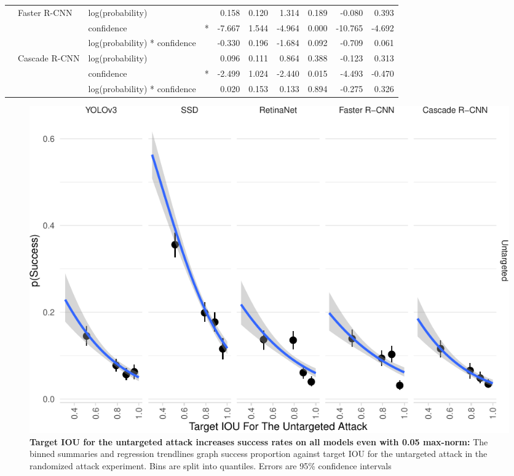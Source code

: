 \begin{longtable}[t]{llllrrrrrr}
\cmidrule{2-10}\nopagebreak
\hspace{1em} & Faster R-CNN & log(probability) &  & 0.158 & 0.120 & 1.314 & 0.189 & -0.080 & 0.393\\
\cmidrule{3-10}\nopagebreak
\hspace{1em} &  & confidence & * & -7.667 & 1.544 & -4.964 & 0.000 & -10.765 & -4.692\\
\cmidrule{3-10}\nopagebreak
\hspace{1em} &  & log(probability) * confidence &  & -0.330 & 0.196 & -1.684 & 0.092 & -0.709 & 0.061\\
\cmidrule{2-10}\nopagebreak
\hspace{1em} & Cascade R-CNN & log(probability) &  & 0.096 & 0.111 & 0.864 & 0.388 & -0.123 & 0.313\\
\cmidrule{3-10}\nopagebreak
\hspace{1em} &  & confidence & * & -2.499 & 1.024 & -2.440 & 0.015 & -4.493 & -0.470\\
\cmidrule{3-10}\nopagebreak
\hspace{1em} &  & log(probability) * confidence &  & 0.020 & 0.153 & 0.133 & 0.894 & -0.275 & 0.326\\
\bottomrule
\end{longtable}
\endgroup{}

\begin{figure}[tb]

{\centering \includegraphics{imgs/untarget_iou_graph-1} 

}

\caption{\textbf{Target IOU for the untargeted attack increases success rates on all models even with 0.05 max-norm:}  The binned summaries and regression trendlines graph success proportion against target IOU for the untargeted attack in the randomized attack experiment. Bins are split into quantiles. Errors are 95\% confidence intervals}\label{fig:untarget_iou_graph}
\end{figure}

